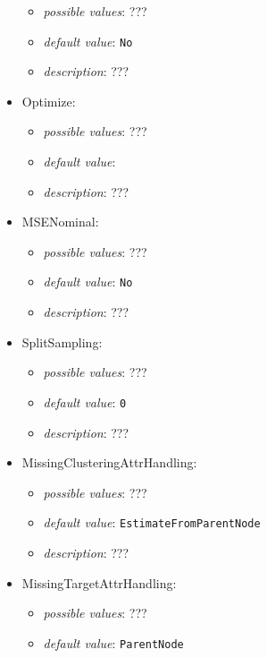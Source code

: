 \documentclass{article}
\begin{document}
\begin{itemize}
           \begin{itemize}
                \item \emph{possible values}: ???
                \item \emph{default value}: \texttt{No}
                \item \emph{description}: ???
           \end{itemize}
    \item Optimize:
           \begin{itemize}
                \item \emph{possible values}: ???
                \item \emph{default value}: \texttt{{}}
                \item \emph{description}: ???
           \end{itemize}
    \item MSENominal:
           \begin{itemize}
                \item \emph{possible values}: ???
                \item \emph{default value}: \texttt{No}
                \item \emph{description}: ???
           \end{itemize}
    \item SplitSampling:
           \begin{itemize}
                \item \emph{possible values}: ???
                \item \emph{default value}: \texttt{0}
                \item \emph{description}: ???
           \end{itemize}
    \item MissingClusteringAttrHandling:
           \begin{itemize}
                \item \emph{possible values}: ???
                \item \emph{default value}: \texttt{EstimateFromParentNode}
                \item \emph{description}: ???
           \end{itemize}
    \item MissingTargetAttrHandling:
           \begin{itemize}
                \item \emph{possible values}: ???
                \item \emph{default value}: \texttt{ParentNode}

\end{itemize}
\end{itemize}
\end{document}
